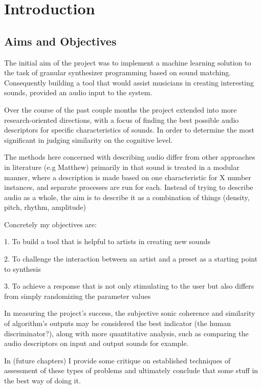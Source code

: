 \chapter{Introduction}
\label{chapterlabel1}

\section{Aims and Objectives}

The initial aim of the project was to implement a machine learning solution to
the task of granular synthesizer programming based on sound matching.
Consequently building a tool that would assist musicians in creating interesting
sounds, provided an audio input to the system.

Over the course of the past couple months the project extended into more
research-oriented directions, with a focus of finding the best possible audio
descriptors for specific characteristics of sounds. In order to determine the
most significant in judging similarity on the cognitive level.

The methods here concerned with describing audio differ from other approaches in
literature (e.g Matthew) primarily in that sound is treated in a modular manner,
where a description is made based on one characteristic for X number instances,
and separate processes are run for each. Instead of trying to describe audio as
a whole, the aim is to describe it as a combination of things (density, pitch,
rhythm, amplitude)

Concretely my objectives are:

1. To build a tool that is helpful to artists in creating new sounds 

2. To challenge the interaction between an artist and a preset as a starting
point to synthesis 

3. To achieve a response that is not only stimulating to the user but also differs
from simply randomizing the parameter values 

In measuring the project's success, the subjective sonic coherence and
similarity of algorithm's outputs may be considered the best indicator (the
human discriminator?), along with more quantitative analysis, such as comparing
the audio descriptors on input and output sounds for example.

In (future chapters) I provide some critique on established techniques of
assessment of these types of problems and ultimately conclude that some stuff in
the best way of doing it.

